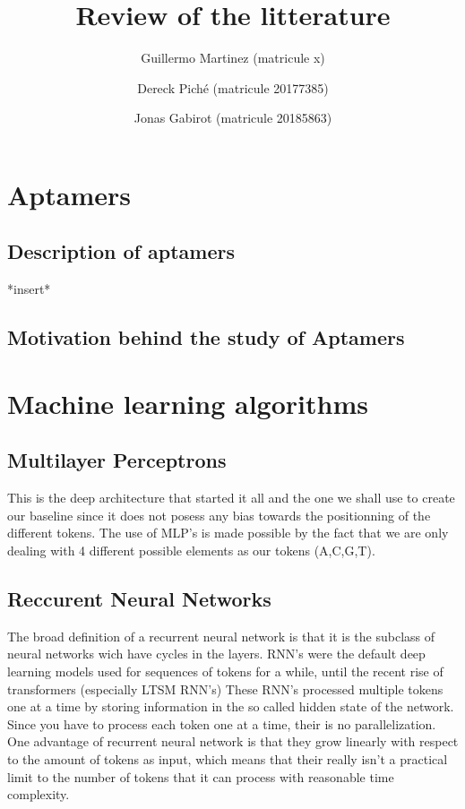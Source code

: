 \documentclass{article}
\title{Review of the litterature}
\author
{
    Guillermo Martinez (matricule x)
    \and
    Dereck Piché (matricule 20177385)
    \and
    Jonas Gabirot (matricule 20185863)
}
\begin{document}
\maketitle

\section*{Aptamers}
\subsection*{Description of aptamers}
*insert*
\subsection*{Motivation behind the study of Aptamers}


\section*{Machine learning algorithms}
\subsection*{Multilayer Perceptrons}
This is the deep architecture that started it all 
and the one we shall use to create our baseline since it does 
not posess any bias towards the positionning of 
the different tokens. The use of MLP's is made possible by the fact 
that we are only dealing with 4 different possible elements as our tokens
(A,C,G,T).

\subsection*{Reccurent Neural Networks}
The broad definition of a recurrent neural network 
is that it is the subclass of neural networks \cite{lstms} wich have cycles in the layers. 
RNN's were the default deep learning models used for sequences
of tokens for a while, until the recent rise of transformers (especially LTSM RNN's) 
These RNN's processed multiple tokens one at a time by storing information in the so called
hidden state of the network. Since you have to process each token one at 
a time, their is no parallelization. 
One advantage of recurrent neural network is that they grow 
linearly with respect to the amount of tokens as input, which means 
that their really isn't a practical limit to the number of tokens that
it can process with reasonable time complexity. 
\end{document}
